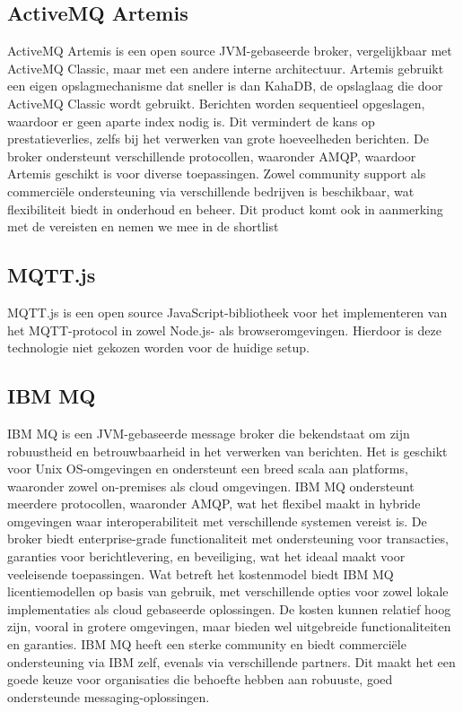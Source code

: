   \subsection{ActiveMQ Artemis}
ActiveMQ Artemis is een open source JVM-gebaseerde broker, vergelijkbaar met ActiveMQ Classic, maar met een andere interne architectuur.
Artemis gebruikt een eigen opslagmechanisme dat sneller is dan KahaDB, de opslaglaag die door ActiveMQ Classic wordt gebruikt.
Berichten worden sequentieel opgeslagen, waardoor er geen aparte index nodig is.
Dit vermindert de kans op prestatieverlies, zelfs bij het verwerken van grote hoeveelheden berichten.
De broker ondersteunt verschillende protocollen, waaronder AMQP, waardoor Artemis geschikt is voor diverse toepassingen.
Zowel community support als commerciële ondersteuning via verschillende bedrijven is beschikbaar, 
wat flexibiliteit biedt in onderhoud en beheer.
Dit product komt ook in aanmerking met de vereisten en nemen we mee in de shortlist

\subsection{MQTT.js}
MQTT.js is een open source JavaScript-bibliotheek voor het implementeren van het MQTT-protocol in zowel Node.js- als browseromgevingen.
Hierdoor is deze technologie niet gekozen worden voor de huidige setup.


\subsection{IBM MQ}
IBM MQ is een JVM-gebaseerde message broker die bekendstaat om zijn robuustheid en betrouwbaarheid in het verwerken van berichten.
Het is geschikt voor Unix OS-omgevingen en ondersteunt een breed scala aan platforms, waaronder zowel on-premises als cloud omgevingen.
IBM MQ ondersteunt meerdere protocollen, waaronder AMQP, wat het flexibel maakt in hybride omgevingen waar interoperabiliteit met verschillende systemen vereist is.
De broker biedt enterprise-grade functionaliteit met ondersteuning voor transacties, garanties voor berichtlevering, en beveiliging, wat het ideaal maakt voor veeleisende toepassingen.
Wat betreft het kostenmodel biedt IBM MQ licentiemodellen op basis van gebruik, met verschillende opties voor zowel lokale implementaties als cloud gebaseerde oplossingen.
De kosten kunnen relatief hoog zijn, vooral in grotere omgevingen, maar bieden wel uitgebreide functionaliteiten en garanties.
IBM MQ heeft een sterke community en biedt commerciële ondersteuning via IBM zelf, evenals via verschillende partners. Dit maakt het een goede keuze voor organisaties die behoefte hebben aan robuuste, goed ondersteunde messaging-oplossingen.

